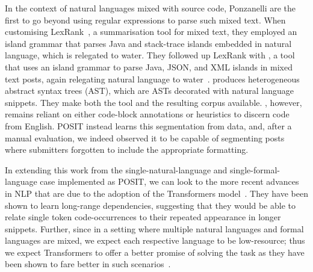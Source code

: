 In the context of natural languages mixed with source code, Ponzanelli \etal are
the first to go beyond using regular expressions to parse such mixed text. When
customising LexRank~\cite{Ponzanelli2015b}, a summarisation tool for mixed text,
they employed an island grammar that parses Java and stack-trace islands
embedded in natural language, which is relegated to water. They followed up
LexRank with \stormed, a tool that uses an island grammar to parse Java, JSON,
and XML islands in mixed text \SO posts, again relegating natural language to
water~\cite{Ponzanelli2015a}.  \stormed produces heterogeneous abstract syntax
trees (AST), which are ASTs decorated with natural language snippets. They make
both the tool and the resulting corpus available. \stormed, however, remains
reliant on either code-block annotations or heuristics to discern code from
English. POSIT instead learns this segmentation from data, and, after a manual
evaluation, we indeed observed it to be capable of segmenting \SO posts where
submitters forgotten to include the appropriate formatting.

In extending this work from the single-natural-language and
single-formal-language case implemented as POSIT, we can look to the more recent
advances in NLP that are due to the adoption of the Transformers
model~\cite{vaswani2017attention, wang2019language}. They have been shown to
learn long-range dependencies, suggesting that they would be able to relate
single token code-occurrences to their repeated appearance in longer snippets.
Further, since in a setting where multiple natural languages and formal
languages are mixed, we expect each respective language to be low-resource; thus
we expect Transformers to offer a better promise of solving the task as they
have been shown to fare better in such scenarios~\cite{lakew2017multilingual}.